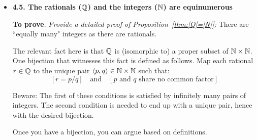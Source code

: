 
\begin{itemize}
\item
{\bf 4.5. The rationals ($\mathbb{Q}$) and the integers ($\mathbb{N}$) are equinumerous}
\smallskip

{\bf To prove}. {\em Provide a {\em detailed} proof of Proposition~\ref{thm:|Q|=|N|}:} 
There are ``equally many" integers as there are rationals.

\smallskip

The relevant fact here is that $\mathbb{Q}$ is (isomorphic to) a proper subset of $\mathbb{N} \times \mathbb{N}$.  One bijection that witnesses this fact is defined as follows.  Map each rational $r \in \mathbb{Q}$ to the unique pair $\langle p,q \rangle \in \mathbb{N} \times \mathbb{N}$ such that:
\[ [r = p/q] \ \ \  \mbox{ and } \ \ \  [\mbox{$p$ and $q$ share no common factor}] \]

\smallskip

Beware: The first of these conditions is satisfied by infinitely many pairs of integers.  The second condition is needed to end up with a unique pair, hence with the desired bijection.

\smallskip

Once you have a bijection, you can argue based on definitions.
\end{itemize}



